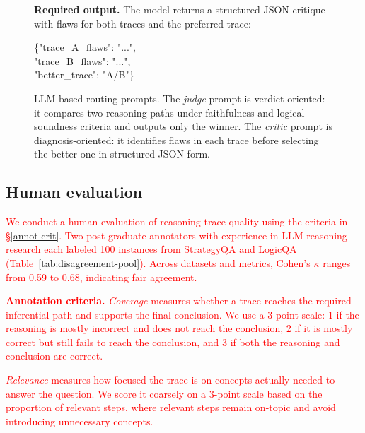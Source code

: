 \documentclass[11pt]{article}
\begin{document}
{\begin{figure}[t]
\begin{minipage}[t]{0.485\textwidth}
\begin{tcolorbox}[promptcard,title=LLM-as-Critic]
\vspace{-2pt}
\textbf{Required output.}
The model returns a structured JSON critique with flaws for both traces and the preferred trace:
\begin{center}
\ttfamily
\{"trace\_A\_flaws": "...",\\
"trace\_B\_flaws": "...",\\
"better\_trace": "A/B"\}
\end{center}
\end{tcolorbox}
\end{minipage}

\vspace{2pt}
\caption{LLM-based routing prompts. The \emph{judge} prompt is verdict-oriented: it compares two reasoning paths under faithfulness and logical soundness criteria and outputs only the winner. The \emph{critic} prompt is diagnosis-oriented: it identifies flaws in each trace before selecting the better one in structured JSON form.}
\label{fig:judge_critic_prompts}
\end{figure}




\subsection{Human evaluation}\label{app:human_eval}
\textcolor{red}{We conduct a human evaluation of reasoning-trace quality using the criteria in \S\ref{annot-crit}. Two post-graduate annotators with experience in LLM reasoning research each labeled 100 instances from StrategyQA and LogicQA (Table~\ref{tab:disagreement-pool}). Across datasets and metrics, Cohen's \(\kappa\) ranges from 0.59 to 0.68, indicating fair agreement.}


\textcolor{red}{\noindent\textbf{Annotation criteria.}\label{annot-crit}}
\textcolor{red}{\textit{Coverage} measures whether a trace reaches the required inferential path and supports the final conclusion. We use a 3-point scale: 1 if the reasoning is mostly incorrect and does not reach the conclusion, 2 if it is mostly correct but still fails to reach the conclusion, and 3 if both the reasoning and conclusion are correct.}

\textcolor{red}{\noindent\textit{Relevance} measures how focused the trace is on concepts actually needed to answer the question. We score it coarsely on a 3-point scale based on the proportion of relevant steps, where relevant steps remain on-topic and avoid introducing unnecessary concepts.}

}
\end{document}
